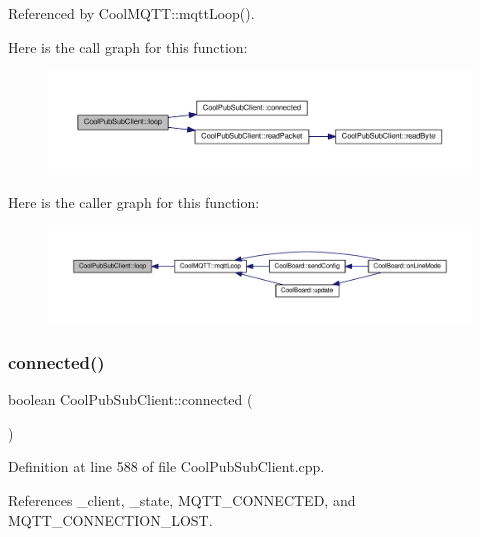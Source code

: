 Referenced by Cool\+M\+Q\+T\+T\+::mqtt\+Loop().

Here is the call graph for this function\+:
\nopagebreak
\begin{figure}[H]
\begin{center}
\leavevmode
\includegraphics[width=350pt]{d8/d4b/class_cool_pub_sub_client_afc15900f0fc4886a19394508e61793b8_cgraph}
\end{center}
\end{figure}
Here is the caller graph for this function\+:
\nopagebreak
\begin{figure}[H]
\begin{center}
\leavevmode
\includegraphics[width=350pt]{d8/d4b/class_cool_pub_sub_client_afc15900f0fc4886a19394508e61793b8_icgraph}
\end{center}
\end{figure}
\mbox{\label{class_cool_pub_sub_client_a3d5a5da4ddb1e5c1bea64d80c665d148}} 
\subsubsection{\texorpdfstring{connected()}{connected()}}
{\footnotesize\ttfamily boolean Cool\+Pub\+Sub\+Client\+::connected (\begin{DoxyParamCaption}{ }\end{DoxyParamCaption})}



Definition at line 588 of file Cool\+Pub\+Sub\+Client.\+cpp.



References \+\_\+client, \+\_\+state, M\+Q\+T\+T\+\_\+\+C\+O\+N\+N\+E\+C\+T\+ED, and M\+Q\+T\+T\+\_\+\+C\+O\+N\+N\+E\+C\+T\+I\+O\+N\+\_\+\+L\+O\+ST.



